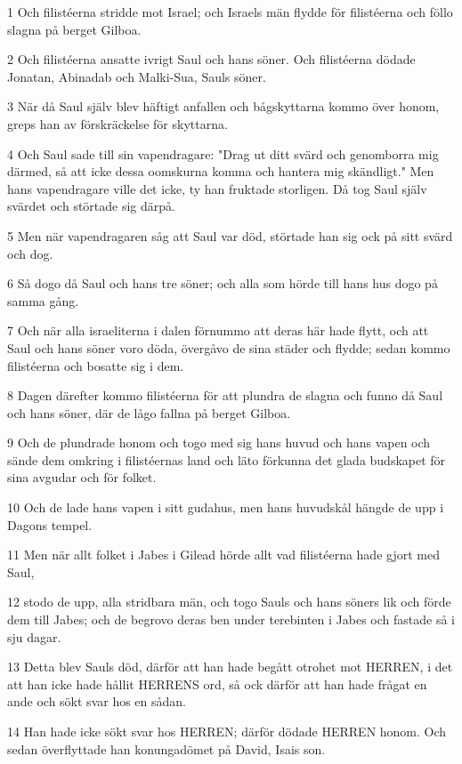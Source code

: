 \par 1 Och filistéerna stridde mot Israel; och Israels män flydde för filistéerna och föllo slagna på berget Gilboa.
\par 2 Och filistéerna ansatte ivrigt Saul och hans söner. Och filistéerna dödade Jonatan, Abinadab och Malki-Sua, Sauls söner.
\par 3 När då Saul själv blev häftigt anfallen och bågskyttarna kommo över honom, greps han av förskräckelse för skyttarna.
\par 4 Och Saul sade till sin vapendragare: "Drag ut ditt svärd och genomborra mig därmed, så att icke dessa oomskurna komma och hantera mig skändligt." Men hans vapendragare ville det icke, ty han fruktade storligen. Då tog Saul själv svärdet och störtade sig därpå.
\par 5 Men när vapendragaren såg att Saul var död, störtade han sig ock på sitt svärd och dog.
\par 6 Så dogo då Saul och hans tre söner; och alla som hörde till hans hus dogo på samma gång.
\par 7 Och när alla israeliterna i dalen förnummo att deras här hade flytt, och att Saul och hans söner voro döda, övergåvo de sina städer och flydde; sedan kommo filistéerna och bosatte sig i dem.
\par 8 Dagen därefter kommo filistéerna för att plundra de slagna och funno då Saul och hans söner, där de lågo fallna på berget Gilboa.
\par 9 Och de plundrade honom och togo med sig hans huvud och hans vapen och sände dem omkring i filistéernas land och läto förkunna det glada budskapet för sina avgudar och för folket.
\par 10 Och de lade hans vapen i sitt gudahus, men hans huvudskål hängde de upp i Dagons tempel.
\par 11 Men när allt folket i Jabes i Gilead hörde allt vad filistéerna hade gjort med Saul,
\par 12 stodo de upp, alla stridbara män, och togo Sauls och hans söners lik och förde dem till Jabes; och de begrovo deras ben under terebinten i Jabes och fastade så i sju dagar.
\par 13 Detta blev Sauls död, därför att han hade begått otrohet mot HERREN, i det att han icke hade hållit HERRENS ord, så ock därför att han hade frågat en ande och sökt svar hos en sådan.
\par 14 Han hade icke sökt svar hos HERREN; därför dödade HERREN honom. Och sedan överflyttade han konungadömet på David, Isais son.

